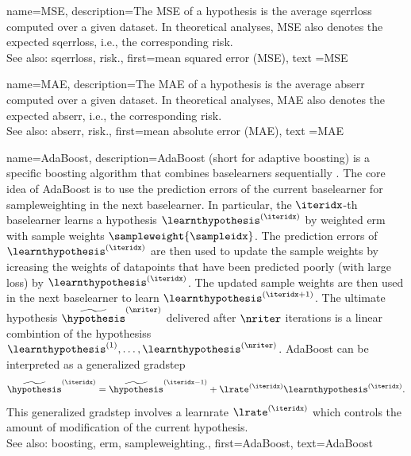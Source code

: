 {name={MSE}, 
 description={The MSE  of a \gls{hypothesis} 
               is the average \gls{sqerrloss} computed over a given \gls{dataset}. 
               In theoretical analyses, MSE also denotes the expected \gls{sqerrloss}, 
               i.e., the corresponding \gls{risk}.\\ 
			   See also: \gls{sqerrloss}, \gls{risk}.}, 
 first={mean squared error (MSE)}, 
 text ={MSE}
}

{name={MAE}, 
 description={The MAE  of a \gls{hypothesis} 
               is the average \gls{abserr} computed over a given \gls{dataset}. 
               In theoretical analyses, MAE also denotes the expected \gls{abserr}, 
               i.e., the corresponding \gls{risk}.\\ 
			   See also: \gls{abserr}, \gls{risk}.}, 
 first={mean absolute error (MAE)}, 
 text ={MAE}
}



{name={AdaBoost},
	description={AdaBoost (short for adaptive \gls{boosting}) is a specific 
		\gls{boosting} \gls{algorithm} that combines \glspl{baselearner} sequentially 
		\cite{pmlr-vR2-ridgeway99a,Schapire1999,Drucker1997}. 
	    The core idea of AdaBoost is to use the \gls{prediction} errors of the current  
		\gls{baselearner} for \gls{sampleweighting} in the next \gls{baselearner}. 
		In particular, the $\iteridx$-th \gls{baselearner} learns a \gls{hypothesis} 
		$\learnthypothesis^{(\iteridx)}$ by weighted \gls{erm} with  
		sample weights $\sampleweight{\sampleidx}$. The prediction errors of 
		$\learnthypothesis^{(\iteridx)}$ are then used to update the 
		sample weights by icreasing the weights of \glspl{datapoint} 
		that have been predicted poorly (with large \gls{loss}) 
		by $\learnthypothesis^{(\iteridx)}$. The updated sample weights are 
		then used in the next \gls{baselearner} to learn $\learnthypothesis^{(\iteridx+1)}$. 
		The ultimate \gls{hypothesis} $\widetilde{\hypothesis}^{(\nriter)}$ delivered after 
		$\nriter$ \glspl{iteration} is a linear combintion of the \glspl{hypothesis} 
		$\learnthypothesis^{(1)},\ldots,\learnthypothesis^{(\nriter)}$. 
		AdaBoost can be interpreted as a generalized \gls{gradstep} \cite[Ch. 10.4]{hastie01statisticallearning}
		$$\widetilde{\hypothesis}^{(\iteridx)}=\widetilde{\hypothesis}^{(\iteridx-1)}+\lrate^{(\iteridx)} \learnthypothesis^{(\iteridx)}.$$   
		This generalized \gls{gradstep} involves a \gls{learnrate} $\lrate^{(\iteridx)}$ which 
		controls the amount of modification of the current \gls{hypothesis}. \\
		See also: \gls{boosting}, \gls{erm}, \gls{sampleweighting}.}, 
	first={AdaBoost}, 
	text={AdaBoost}
}

